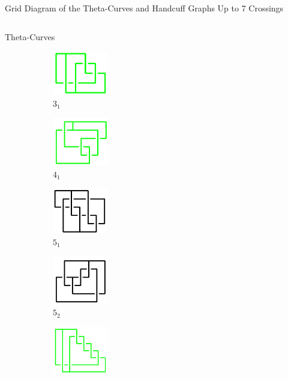 \documentclass[final]{beamer}
\begin{document}
\begin{frame}[t]
 \begin{alertblock}{Grid Diagram of the Theta-Curves and Handcuff Graphs Up to 7 Crossings}
  \begin{columns}[t]
  \begin{column}{0.6\textwidth}
  \begin{alertblock}{Theta-Curves}
  \begin{figure}
    \begin{subfigure}{0.075\textwidth}
    \includegraphics[width=2.4cm]{../Midterm_Poster/grid_diagram/theta_3_1.png}
    \caption{$3_1$} 
    \end{subfigure}
    \begin{subfigure}{0.075\textwidth}
    \includegraphics[width=2.4cm]{../Midterm_Poster/grid_diagram/theta_4_1.png}
    \caption{$4_1$} 
    \end{subfigure}
    \begin{subfigure}{0.075\textwidth}
    \includegraphics[width=2.4cm]{../Midterm_Poster/grid_diagram/theta_5_1.png}
    \caption{$5_1$}
    \end{subfigure}
    \begin{subfigure}{0.075\textwidth}
    \includegraphics[width=2.4cm]{../Midterm_Poster/grid_diagram/theta_5_2.png}
    \caption{$5_2$} 
    \end{subfigure}
    \begin{subfigure}{0.075\textwidth}
    \includegraphics[width=2.4cm]{../Midterm_Poster/grid_diagram/theta_5_3.png}

\end{subfigure}
\end{figure}
\end{alertblock}
\end{column}
\end{columns}
\end{alertblock}
\end{frame}
\end{document}
